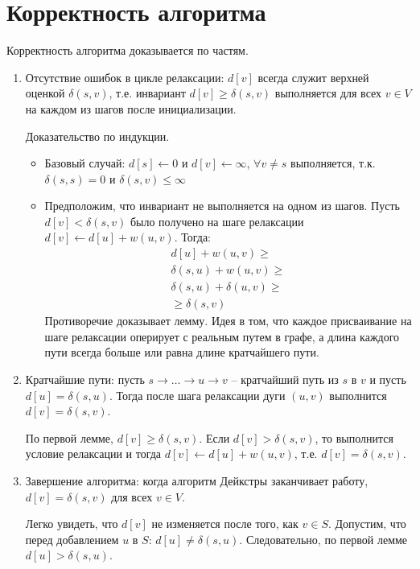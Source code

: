 \documentclass[11pt]{article}
\begin{document}
\section{Корректность алгоритма}
Корректность алгоритма доказывается по частям.
\begin{enumerate}
\item Отсутствие ошибок в цикле релаксации: $d[v]$ всегда служит верхней оценкой $\delta(s, v)$, т.е. инвариант $d[v] \geqslant \delta(s, v)$ выполняется для всех $v \in V$ на каждом из шагов после инициализации.

Доказательство по индукции.
\begin{itemize}
\item Базовый случай: $d[s] \leftarrow 0$ и $d[v] \leftarrow \infty$, $\forall v \neq s$
  выполняется, т.к. $\delta(s, s) = 0$ и $\delta(s, v) \leqslant \infty$
\item Предположим, что инвариант не выполняется на одном из шагов. Пусть $d[v] < \delta(s, v)$ было получено на шаге релаксации $d[v] \leftarrow d[u] + w(u, v)$. Тогда:
  \begin{align*}
    d[u] + w(u, v) \geqslant \\
    \delta(s, u) + w(u, v) \geqslant \\
    \delta(s, u) + \delta(u, v) \geqslant \\
    \geqslant \delta(s, v)
  \end{align*}
Противоречие доказывает лемму. Идея в том, что каждое присваивание на шаге релаксации оперирует с реальным путем в графе, а длина каждого пути всегда больше или равна длине кратчайшего пути.
\end{itemize}
\item Кратчайшие пути: пусть $s \to \ldots \to u \to v$ -- кратчайший путь из $s$ в $v$ и пусть $d[u] = \delta(s, u)$. Тогда после шага релаксации дуги $(u, v)$ выполнится $d[v] = \delta(s, v)$.

По первой лемме, $d[v] \geqslant \delta(s, v)$. Если $d[v] > \delta(s, v)$, то выполнится условие релаксации и тогда $d[v] \leftarrow d[u] + w(u, v)$, т.е. $d[v] = \delta(s, v)$.
\item Завершение алгоритма: когда алгоритм Дейкстры заканчивает работу, $d[v] = \delta(s, v)$ для всех $v \in V$.

Легко увидеть, что $d[v]$ не изменяется после того, как $v \in S$. Допустим, что перед добавлением $u$ в $S$: $d[u] \neq \delta(s, u)$. Следовательно, по первой лемме $d[u] > \delta(s, u)$.


\end{enumerate}
\end{document}
